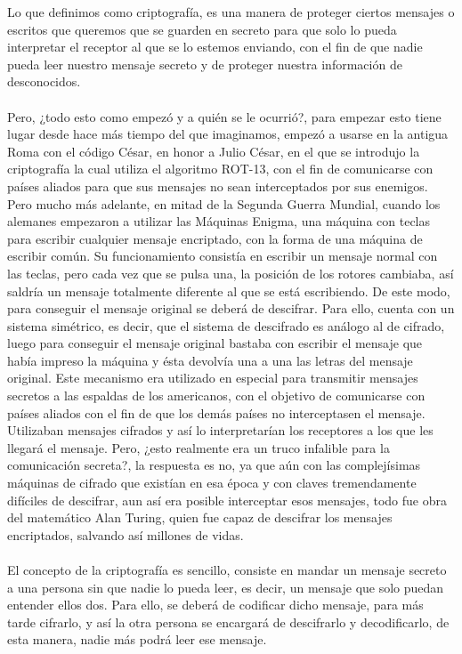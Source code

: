 \documentclass[12pt,a4paper]{book}
\theoremstyle{change}
\begin{document}
	Lo que definimos como criptografía, es una manera de proteger ciertos mensajes o escritos que queremos que se guarden en secreto para que solo lo pueda interpretar el receptor al que se lo estemos enviando, con el fin de que nadie pueda leer nuestro mensaje secreto y de proteger nuestra información de desconocidos.\\
	\vspace{5mm}\\ %
	Pero, ¿todo esto como empezó y a quién se le ocurrió?, para empezar esto tiene lugar desde hace más tiempo del que imaginamos, empezó a usarse en la antigua Roma con el código César, en honor a Julio César, en el que se introdujo la criptografía la cual utiliza el algoritmo ROT-13, con el fin de comunicarse con países aliados para que sus mensajes no sean interceptados por sus enemigos. Pero mucho más adelante, en mitad de la Segunda Guerra Mundial, cuando los alemanes empezaron a utilizar las Máquinas Enigma, una máquina con teclas para escribir cualquier mensaje encriptado, con la forma de una máquina de escribir común. Su funcionamiento consistía en escribir un mensaje normal con las teclas, pero cada vez que se pulsa una, la posición de los rotores cambiaba, así saldría un mensaje totalmente diferente al que se está escribiendo. De este modo, para conseguir el mensaje original se deberá de descifrar. Para ello, cuenta con un sistema simétrico, es decir, que el sistema de descifrado es análogo al de cifrado, luego para conseguir el mensaje original bastaba con escribir el mensaje que había impreso la máquina y ésta devolvía una a una las letras del mensaje original. Este mecanismo era utilizado en especial para transmitir mensajes secretos a las espaldas de los americanos, con el objetivo de comunicarse con países aliados con el fin de que los demás países no interceptasen el mensaje. Utilizaban mensajes cifrados y así lo interpretarían los receptores a los que les llegará el mensaje. Pero, ¿esto realmente era un truco infalible para la comunicación secreta?, la respuesta es no, ya que aún con las complejísimas máquinas de cifrado que existían en esa época y con claves tremendamente difíciles de descifrar, aun así era posible interceptar esos mensajes, todo fue obra del matemático Alan Turing, quien fue capaz de descifrar los mensajes encriptados, salvando así millones de vidas.\\
	\vspace{5mm}\\%
	El concepto de la criptografía es sencillo, consiste en mandar un mensaje secreto a una persona sin que nadie lo pueda leer, es decir, un mensaje que solo puedan entender ellos dos. Para ello, se deberá de codificar dicho mensaje, para más tarde cifrarlo, y así la otra persona se encargará de descifrarlo y decodificarlo, de esta manera, nadie más podrá leer ese mensaje.\\
\end{document}
